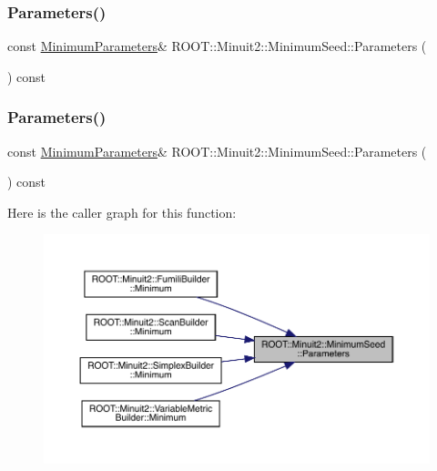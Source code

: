 \subsubsection{\texorpdfstring{Parameters()}{Parameters()}\hspace{0.1cm}{\footnotesize\ttfamily [1/3]}}
{\footnotesize\ttfamily const \mbox{\hyperlink{classROOT_1_1Minuit2_1_1MinimumParameters}{Minimum\+Parameters}}\& R\+O\+O\+T\+::\+Minuit2\+::\+Minimum\+Seed\+::\+Parameters (\begin{DoxyParamCaption}{ }\end{DoxyParamCaption}) const\hspace{0.3cm}{\ttfamily [inline]}}

\mbox{\label{classROOT_1_1Minuit2_1_1MinimumSeed_a994d60b61e96fefc68cbccab8f82794d}} 
\subsubsection{\texorpdfstring{Parameters()}{Parameters()}\hspace{0.1cm}{\footnotesize\ttfamily [2/3]}}
{\footnotesize\ttfamily const \mbox{\hyperlink{classROOT_1_1Minuit2_1_1MinimumParameters}{Minimum\+Parameters}}\& R\+O\+O\+T\+::\+Minuit2\+::\+Minimum\+Seed\+::\+Parameters (\begin{DoxyParamCaption}{ }\end{DoxyParamCaption}) const\hspace{0.3cm}{\ttfamily [inline]}}

Here is the caller graph for this function\+:
\nopagebreak
\begin{figure}[H]
\begin{center}
\leavevmode
\includegraphics[width=350pt]{d1/d50/classROOT_1_1Minuit2_1_1MinimumSeed_a994d60b61e96fefc68cbccab8f82794d_icgraph}
\end{center}
\end{figure}
\mbox{\label{classROOT_1_1Minuit2_1_1MinimumSeed_a994d60b61e96fefc68cbccab8f82794d}} 
